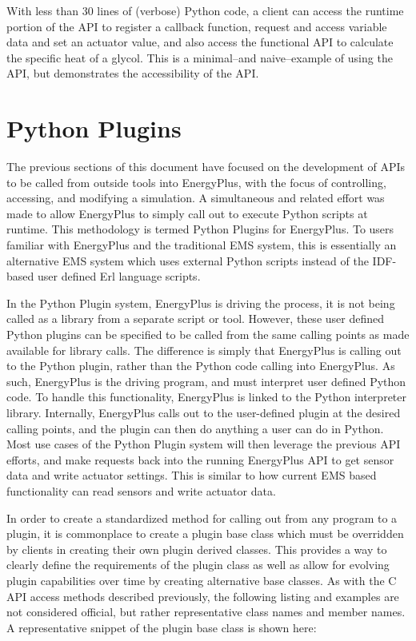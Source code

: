 \documentclass[5p, authoryear]{elsarticle}
\begin{document}
With less than 30 lines of (verbose) Python code, a client can access the runtime portion of the API to register a callback function, request and access variable data and set an actuator value, and also access the functional API to calculate the specific heat of a glycol.  This is a minimal--and naive--example of using the API, but demonstrates the accessibility of the API.

 \section{Python Plugins}
The previous sections of this document have focused on the development of APIs to be called from outside tools into EnergyPlus, with the focus of controlling, accessing, and modifying a simulation.  A simultaneous and related effort was made to allow EnergyPlus to simply call out to execute Python scripts at runtime.  This methodology is termed Python Plugins for EnergyPlus.  To users familiar with EnergyPlus and the traditional EMS system, this is essentially an alternative EMS system which uses external Python scripts instead of the IDF-based user defined Erl language scripts.

In the Python Plugin system, EnergyPlus is driving the process, it is not being called as a library from a separate script or tool.  However, these user defined Python plugins can be specified to be called from the same calling points as made available for library calls.  The difference is simply that EnergyPlus is calling out to the Python plugin, rather than the Python code calling into EnergyPlus.  As such, EnergyPlus is the driving program, and must interpret user defined Python code.  To handle this functionality, EnergyPlus is linked to the Python interpreter library.    Internally, EnergyPlus calls out to the user-defined plugin at the desired calling points, and the plugin can then do anything a user can do in Python.  Most use cases of the Python Plugin system will then leverage the previous API efforts, and make requests back into the running EnergyPlus API to get sensor data and write actuator settings.  This is similar to how current EMS based functionality can read sensors and write actuator data.

In order to create a standardized method for calling out from any program to a plugin, it is commonplace to create a plugin base class which must be overridden by clients in creating their own plugin derived classes.  This provides a way to clearly define the requirements of the plugin class as well as allow for evolving plugin capabilities over time by creating alternative base classes.  As with the C API access methods described previously, the following listing and examples are not considered official, but rather representative class names and member names.  A representative snippet of the plugin base class is shown here:
\end{document}

